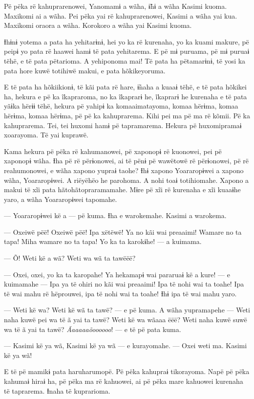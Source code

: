 Pë pëka rë kahuprarenowei, Yanomamɨ a wãha, ɨ̃hɨ a wãha Kasimi kuoma.
Maxikomi ai a wãha. Pei pëka yai rë kahuprarenowei, Kasimi a wãha yai
kua. Maxikomi oraora a wãha. Korokoro a wãha yai Kasimi kuoma. 

Ɨhɨnɨ yotema a pata ha yehitarɨnɨ, hei yo ka rë kurenaha, yo ka kuami
makure, pë peipɨ yo pata rë haawei hamɨ të pata yehitarema. E pë mɨ
puruama, pë mɨ puruaɨ tëhë, e të pata pëtarioma. A yehiponoma mai! Të
pata ha pëtamarɨnɨ, të yosi ka pata hore kuwë totihiwë makui, e pata
hõkikeyoruma. 

E të pata ha hõkiikionɨ, të kãi pata rë hare, ɨ̃naha a kuaaɨ tëhë, e të
pata hõkikei ha, hekura e pë ka ĩkapraroma, no ka ĩkaprarɨ he, ĩkaprarɨ
he kurenaha e të pata yãɨka hërɨɨ tëhë, hekura pë yahipɨ ka
komaaimatayoma, komaa hërɨma, komaa hërɨma, komaa hërɨma, pë pë ka
kahuprarema. Kihi pei ma pë ma rë kõmii. Pë ka kahuprarema. Tei, tei
huxomi hamɨ pë tapramarema. Hekura pë huxomipramaɨ xoarayoma. Të yai
kuprawë. 

Kama hekura pë pëka rë kahumanowei, pë xaponopɨ rë kuonowei, pei pë
xaponopɨ wãha. Ɨha pë rë përɨonowei, ai të pënɨ pë wawëtowë rë
përɨonowei, pë rë reahumonowei, e wãha xapono yupraɨ taohe? Ɨhɨ xapono
Yoararopɨwei a xapono wãha, Yoararopɨwei. A riëyëhëo he parohoma. A nohi
toaɨ totihiomahe. Xapono a makui të xĩi pata hãtohãtopraramamahe. Mɨre
pë xĩi rë kurenaha e xĩi kuaaɨhe yaro, a wãha Yoararopɨwei tapomahe. 

--- Yoararopɨwei kë a --- pë kuma. Ɨha e warokemahe. Kasimi a warokema. 

--- Oxeiwë pëë! Oxeiwë pëë! Ipa xëtëwë! Ya no kãi wai preaaimi! Wamare
no ta tapa! Miha wamare no ta tapa! Yo ka ta karokɨhe! --- a kuimama. 

--- Õ! Weti kë a wã? Weti wa wã ta tawëëë?

--- Oxei, oxei, yo ka ta karopahe! Ya hekamapɨ wai pararuaɨ kë a kure!
--- e kuimamahe --- Ipa ya të ohiri no kãi wai preaaimi! Ipa të nohi wai
ta toahe! Ipa të wai mahu rë hëprouwei, ipa të nohi wai ta toahe! Ɨhɨ
ipa të wai mahu yaro. 

--- Weti kë wa? Weti kë wã ta tawë? --- e pë kuma. A wãha yupramapehe
--- Weti naha kuwë pei wa të ã yai ta tawë? Weti kë wa wãaaa ëëë? Weti
naha kuwë suwë wa të ã yai ta tawë? \textit{Ãaaaaaõoooooo}! --- e të pë pata
kuma. 

--- Kasimi kë ya wã, Kasimi kë ya wã --- e kurayomahe. --- Oxei weti ma.
Kasimi kë ya wã! 

E të pë mamikɨ pata haruharumopë. Pë pëka kahupraɨ tikorayoma. Napë pë
pëka kahumaɨ hiraɨ ha, pë pëka ma rë kahuowei, ai pë pëka mare kahuowei
kurenaha të taprarema. Ɨnaha të kuprarioma. 

